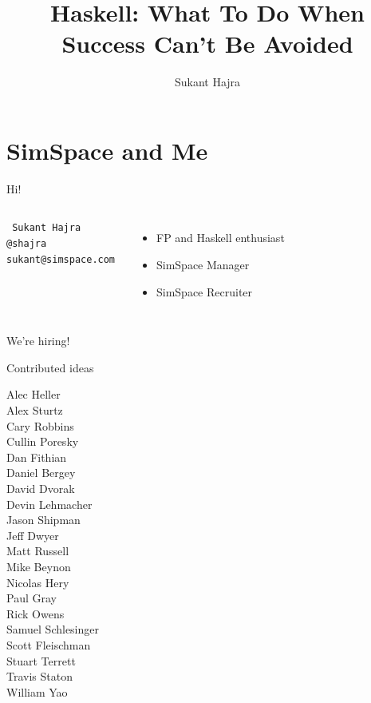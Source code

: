 \documentclass[aspectratio=169,ignorenonframetext]{beamer}
\title[Haskell: What To Do When Success Can't Be Avoided]
{Haskell: What To Do When Success Can't Be Avoided}
\author{Sukant Hajra}
\institute{Haskell eXchange 2021}
\begin{document}
\maketitle

\begin{frame}
	\titlepage{}
\end{frame}

\section{SimSpace and Me}

\begin{frame}{Hi!}
	\begin{columns}
		{\tt
			Sukant Hajra \\
			@shajra \\
			sukant@simspace.com
		}
		\begin{itemize}
			\item FP and Haskell enthusiast
			\item SimSpace Manager
			\item SimSpace Recruiter
		\end{itemize}
	\end{columns}
	\begin{exampleblock}{}
		We're hiring!
	\end{exampleblock}
\end{frame}

\begin{frame}{Contributed ideas}
	\begin{multicols}{3}
		Alec Heller \\
		Alex Sturtz \\
		Cary Robbins \\
		Cullin Poresky \\
		Dan Fithian \\
		Daniel Bergey \\
		David Dvorak \\
		Devin Lehmacher \\
		Jason Shipman \\
		Jeff Dwyer \\
		Matt Russell \\
		Mike Beynon \\
		Nicolas Hery \\
		Paul Gray \\
		Rick Owens \\
		Samuel Schlesinger \\
		Scott Fleischman \\
		Stuart Terrett \\
		Travis Staton \\
		William Yao
	\end{multicols}
\end{frame}
\end{document}
